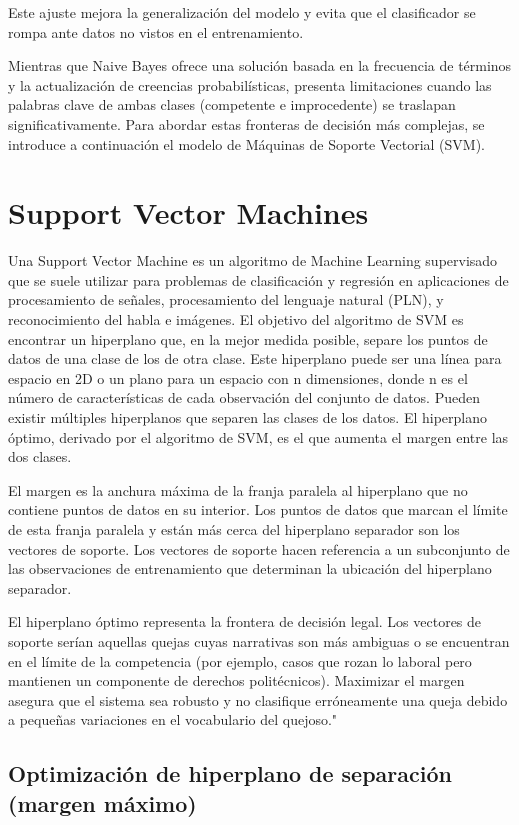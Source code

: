 Este ajuste mejora la generalización del modelo y evita que el clasificador se rompa ante datos no vistos en el entrenamiento.

Mientras que Naive Bayes ofrece una solución basada en la frecuencia de términos y la actualización de creencias probabilísticas, presenta limitaciones cuando las palabras clave de ambas clases (competente e improcedente) se traslapan significativamente. Para abordar estas fronteras de decisión más complejas, se introduce a continuación el modelo de Máquinas de Soporte Vectorial (SVM).

\section{Support Vector Machines}


Una Support Vector Machine es un algoritmo de Machine Learning supervisado que se suele utilizar para problemas de clasificación y regresión en aplicaciones de procesamiento de señales, procesamiento del lenguaje natural (PLN), y reconocimiento del habla e imágenes. El objetivo del algoritmo de SVM es encontrar un hiperplano que, en la mejor medida posible, separe los puntos de datos de una clase de los de otra clase. Este hiperplano puede ser una línea para espacio en 2D o un plano para un espacio con n dimensiones, donde n es el número de características de cada observación del conjunto de datos. Pueden existir múltiples hiperplanos que separen las clases de los datos. El hiperplano óptimo, derivado por el algoritmo de SVM, es el que aumenta el margen entre las dos clases.

El margen es la anchura máxima de la franja paralela al hiperplano que no contiene puntos de datos en su interior. Los puntos de datos que marcan el límite de esta franja paralela y están más cerca del hiperplano separador son los vectores de soporte. Los vectores de soporte hacen referencia a un subconjunto de las observaciones de entrenamiento que determinan la ubicación del hiperplano separador.

El hiperplano óptimo representa la frontera de decisión legal. Los vectores de soporte serían aquellas quejas cuyas narrativas son más ambiguas o se encuentran en el límite de la competencia (por ejemplo, casos que rozan lo laboral pero mantienen un componente de derechos politécnicos). Maximizar el margen asegura que el sistema sea robusto y no clasifique erróneamente una queja debido a pequeñas variaciones en el vocabulario del quejoso."

\subsection{Optimización de hiperplano de separación (margen máximo)}

